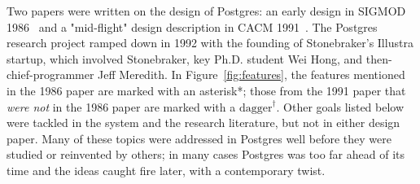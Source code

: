 \documentclass[sigconf,natbib=false]{acmart}
\begin{document}
Two papers were written on the design of Postgres: an early design in SIGMOD 1986~\cite{Stonebraker:1986:DP:16894.16888} and a "mid-flight" design description in CACM 1991~\cite{Stonebraker:1991:PNG:125223.125262}. The Postgres research project ramped down in 1992 with the founding of Stonebraker's Illustra startup, which involved Stonebraker, key Ph.D. student Wei Hong, and then-chief-programmer Jeff Meredith. In Figure~\ref{fig:features}, the features mentioned in the 1986 paper are marked with an asterisk*; those from the 1991 paper that \textit{were not} in the 1986 paper are marked with a $\mbox{dagger}^\dagger$. Other goals listed below were tackled in the system and the research literature, but not in either design paper.
Many of these topics were addressed in Postgres well before they were studied or reinvented by others; in many cases Postgres was too far ahead of its time and the ideas caught fire later, with a contemporary twist.
\end{document}
